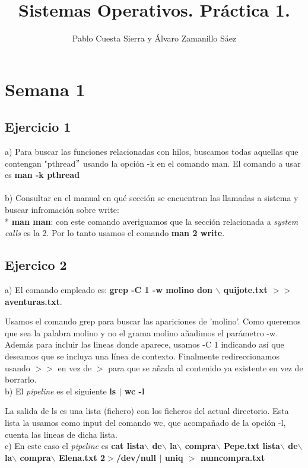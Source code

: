 \documentclass{article}
\title{Sistemas Operativos. Práctica 1.}
\author{Pablo Cuesta Sierra y Álvaro Zamanillo Sáez }
\date{}
\begin{document}
\maketitle


\section*{Semana 1}
\subsection*{Ejercicio 1}
a) Para buscar las funciones relacionadas con hilos, buscamos todas aquellas que contengan "pthread$"$ usando la opción -k en el comando man. El comando a usar es \textbf{man -k pthread}
\\
\\ b) Consultar en el manual en qué sección se encuentran las llamadas a sistema y buscar infromación sobre write:
\\* \textbf{man man}: con este comando averiguamos que la sección relacionada a \textit{system calls} es la 2. Por lo tanto usamos el comando \textbf{man 2 write}.

\subsection*{Ejercico 2}

\noindent a) El comando empleado es: \textbf{grep -C 1 -w molino don $\backslash$ quijote.txt $>$$>$ aventuras.txt}.

Usamos el comando grep para buscar las apariciones de 'molino'. Como queremos que sea la palabra molino y no el grama molino añadimos el parámetro -w.
Además para incluir las lineas donde aparece, usamos -C 1 indicando así que deseamos que se incluya una línea de contexto. Finalmente redireccionamos usando $>$$>$
en vez de $>$ para que se añada al contenido ya existente en vez de borrarlo.
\\

b) El \textit{pipeline} es el siguiente \textbf{ls $|$ wc -l}

La salida de ls es una lista (fichero) con los ficheros del actual directorio. Esta lista la usamos como input del comando wc, que acompañado de la opción -l, 
cuenta las lineas de dicha lista.
\\

c) En este caso el \textit{pipeline} es \textbf{cat lista$\backslash$ de$\backslash$ la$\backslash$ compra$\backslash$ Pepe.txt lista$\backslash$ de$\backslash$ la$\backslash$ compra$\backslash$ Elena.txt 2$>$/dev/null $|$ uniq $>$ numcompra.txt}
\end{document}
